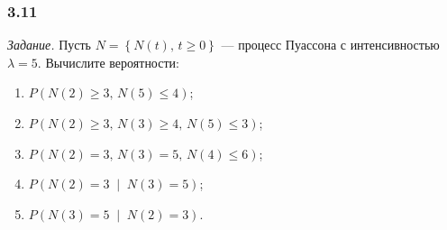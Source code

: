 \subsubsection*{3.11}

\textit{Задание.}
Пусть $N = \left\{ N \left( t \right), \, t \geq 0 \right\} $ ---
процесс Пуассона с интенсивностью $ \lambda = 5$.
Вычислите вероятности:
\begin{enumerate}[label=\alph*)]
  \item $P \left( N \left( 2 \right) \geq 3, \, N \left( 5 \right) \leq 4 \right) $;
  \item $P \left(
    N \left( 2 \right) \geq 3, \, N \left( 3 \right) \geq 4, \, N \left( 5 \right) \leq 3 \right) $;
  \item $P \left(
    N \left( 2 \right) = 3, \, N \left( 3 \right) = 5, \, N \left( 4 \right) \leq 6 \right) $;
  \item $P \left( N \left( 2 \right) = 3 \; \middle| \; N \left( 3 \right) = 5 \right) $;
  \item $P \left( N \left( 3 \right) = 5 \; \middle| \; N \left( 2 \right) = 3 \right) $.
\end{enumerate}

